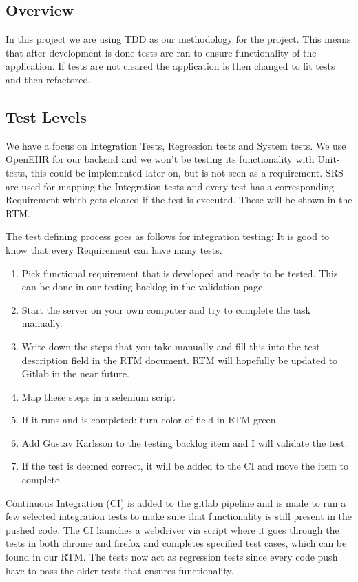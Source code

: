 \subsection{Overview}
In this project we are using TDD as our methodology for the project. This means that after development is done tests are ran to ensure functionality of the application. If tests are not cleared the application is then changed to fit tests and then refactored.  

\subsection{Test Levels}
We have a focus on Integration Tests, Regression tests and System tests. We use OpenEHR for our backend and we won't be testing its functionality with Unit-tests, this could be implemented later on, but is not seen as a requirement. SRS are used for mapping the Integration tests and every test has a corresponding Requirement which gets cleared if the test is executed. These will be shown in the RTM.

The test defining process goes as follows for integration testing:
It is good to know that every Requirement can have many tests.

\begin{enumerate}
    \item Pick functional requirement that is developed and ready to be tested. This can be done in our testing backlog in the validation page. 
    \item Start the server on your own computer and try to complete the task manually.
    \item Write down the steps that you take manually and fill this into the test description field in the RTM document. RTM will hopefully be updated to Gitlab in the near future.
    \item Map these steps in a selenium script
    \item If it runs and is completed: turn color of field in RTM green.
    \item Add Gustav Karlsson to the testing backlog item and I will validate the test.
    \item If the test is deemed correct, it will be added to the CI and move the item to complete.
\end{enumerate}


Continuous Integration (CI) is added to the gitlab pipeline and is made to run a few selected integration tests to make sure that functionality is still present in the pushed code. The CI launches a webdriver via script where it goes through the tests in both chrome and firefox and completes specified test cases, which can be found in our RTM. The tests now act as regression tests since every code push have to pass the older tests that ensures functionality. 

